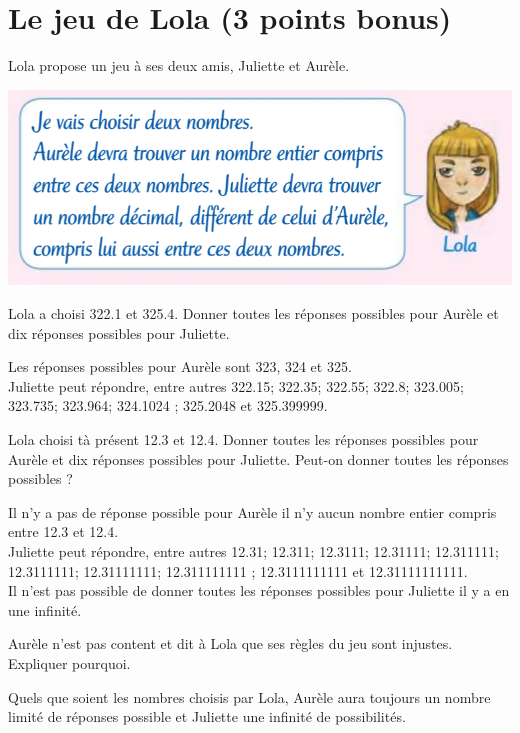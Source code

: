 \section{Le jeu de Lola (3 points bonus)}

Lola propose un jeu à ses deux amis, Juliette et Aurèle.

\begin{center}
	\includegraphics[scale=0.7]{img/lola}
\end{center}

\begin{questions}
	\question[1] Lola a choisi  \num{322.1} et \num{325.4}. Donner toutes les réponses possibles pour Aurèle et dix réponses possibles pour Juliette.
	
	\begin{solution}
		Les réponses possibles pour Aurèle sont 323, 324 et 325. \\
		
		Juliette peut répondre, entre autres \num{322.15}; \num{322.35}; \num{322.55}; \num{322.8}; \num{323.005}; \num{323.735}; \num{323.964}; \num{324.1024} ; \num{325.2048} et \num{325.399999}.
	\end{solution}
	
	\question[1] Lola choisi tà présent \num{12.3} et \num{12.4}. Donner toutes les réponses possibles pour Aurèle et dix réponses possibles pour Juliette. Peut-on donner toutes les réponses possibles ?
	\begin{solution}
		Il n'y a pas de réponse possible pour Aurèle il n'y aucun nombre entier compris entre \num{12.3} et \num{12.4}.\\
		
		Juliette peut répondre, entre autres \num{12.31}; \num{12.311}; \num{12.3111}; \num{12.31111}; \num{12.311111}; \num{12.3111111}; \num{12.31111111}; \num{12.311111111} ; \num{12.3111111111} et \num{12.31111111111}.\\
		
		Il n'est pas possible de donner toutes les réponses possibles pour Juliette il y a en une infinité.
	\end{solution}
	
	
\question[1] Aurèle n'est pas content et dit à Lola que ses règles du jeu sont injustes. Expliquer pourquoi.

\begin{solution}
	Quels que soient les nombres choisis par Lola, Aurèle aura toujours un nombre limité de réponses possible et Juliette une infinité de possibilités.
\end{solution}
\end{questions}